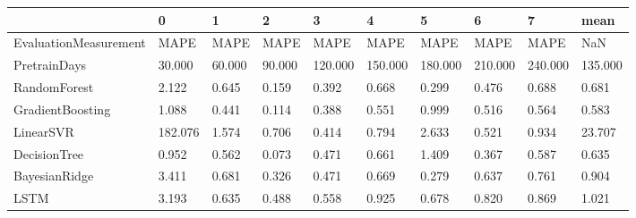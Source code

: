 \begin{tabular}{llllllllll}
\toprule
{} &       0 &      1 &      2 &       3 &       4 &       5 &       6 &       7 &    mean \\
\midrule
EvaluationMeasurement &    MAPE &   MAPE &   MAPE &    MAPE &    MAPE &    MAPE &    MAPE &    MAPE &     NaN \\
PretrainDays          &  30.000 & 60.000 & 90.000 & 120.000 & 150.000 & 180.000 & 210.000 & 240.000 & 135.000 \\
RandomForest          &   2.122 &  0.645 &  0.159 &   0.392 &   0.668 &   0.299 &   0.476 &   0.688 &   0.681 \\
GradientBoosting      &   1.088 &  0.441 &  0.114 &   0.388 &   0.551 &   0.999 &   0.516 &   0.564 &   0.583 \\
LinearSVR             & 182.076 &  1.574 &  0.706 &   0.414 &   0.794 &   2.633 &   0.521 &   0.934 &  23.707 \\
DecisionTree          &   0.952 &  0.562 &  0.073 &   0.471 &   0.661 &   1.409 &   0.367 &   0.587 &   0.635 \\
BayesianRidge         &   3.411 &  0.681 &  0.326 &   0.471 &   0.669 &   0.279 &   0.637 &   0.761 &   0.904 \\
LSTM                  &   3.193 &  0.635 &  0.488 &   0.558 &   0.925 &   0.678 &   0.820 &   0.869 &   1.021 \\
\bottomrule
\end{tabular}
